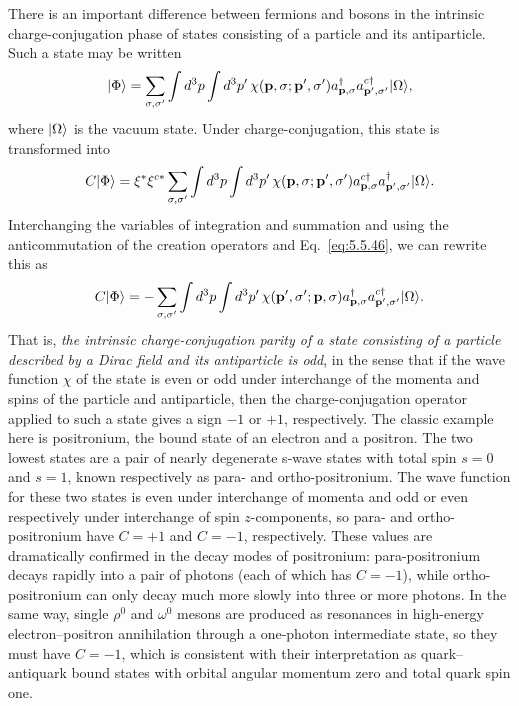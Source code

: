 There is an important difference between fermions and bosons in the intrinsic
charge-conjugation phase of states consisting of a particle and its
antiparticle. Such a state may be written
\[
\lvert \Phi\rangle=\sum_{\sigma,\sigma'}\int d^3p\int d^3p'\,
\chi(\mathbf p,\sigma;\mathbf p',\sigma')a^\dagger_{\mathbf p,\sigma}
a^{c\dagger}_{\mathbf p',\sigma'}\lvert \Omega\rangle,
\]
where $\lvert \Omega\rangle$ is the vacuum state. Under charge-conjugation, this state
is transformed into
\[
C\lvert \Phi\rangle=\xi^*\xi^{c*}\sum_{\sigma,\sigma'}\int d^3p\int d^3p'\,
\chi(\mathbf p,\sigma;\mathbf p',\sigma')a^{c\dagger}_{\mathbf p,\sigma}
a^\dagger_{\mathbf p',\sigma'}\lvert \Omega\rangle.
\]
Interchanging the variables of integration and summation and using the
anticommutation of the creation operators and Eq.~\eqref{eq:5.5.46}, we can rewrite
this as
\[
C\lvert \Phi\rangle=-\sum_{\sigma,\sigma'}\int d^3p\int d^3p'\,
\chi(\mathbf p',\sigma';\mathbf p,\sigma)a^\dagger_{\mathbf p,\sigma}
a^{c\dagger}_{\mathbf p',\sigma'}\lvert \Omega\rangle.
\]
That is, \emph{the intrinsic charge-conjugation parity of a state consisting
of a particle described by a Dirac field and its antiparticle is odd}, in the
sense that if the wave function $\chi$ of the state is even or odd under
interchange of the momenta and spins of the particle and antiparticle, then the
charge-conjugation operator applied to such a state gives a sign $-1$ or $+1$,
respectively. The classic example here is positronium, the bound state of an
electron and a positron. The two lowest states are a pair of nearly degenerate
s-wave states with total spin $s=0$ and $s=1$, known respectively as para- and
ortho-positronium. The wave function for these two states is even under
interchange of momenta and odd or even respectively under interchange of spin
$z$-components, so para- and ortho-positronium have $C=+1$ and $C=-1$,
respectively. These values are dramatically confirmed in the decay modes of
positronium: para-positronium decays rapidly into a pair of photons (each of
which has $C=-1$), while ortho-positronium can only decay much more slowly into
three or more photons. In the same way, single $\rho^0$ and $\omega^0$ mesons
are produced as resonances in high-energy electron--positron annihilation
through a one-photon intermediate state, so they must have $C=-1$, which is
consistent with their interpretation as quark--antiquark bound states with
orbital angular momentum zero and total quark spin one.

